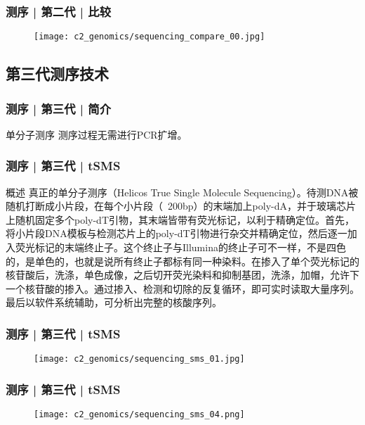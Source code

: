 \begin{frame}
  \frametitle{测序 | 第二代 | \alert{比较}}
  \begin{figure}
    \centering
    \texttt{[image: c2\_genomics/sequencing\_compare\_00.jpg]}
  \end{figure}
\end{frame}

\subsection{第三代测序技术}
\begin{frame}
  \frametitle{测序 | 第三代 | 简介}
  \begin{block}{单分子测序}
测序过程无需进行PCR扩增。
  \end{block}
\end{frame}

\begin{frame}
  \frametitle{测序 | 第三代 | tSMS}
  \begin{block}{概述}
真正的单分子测序（Helicos True Single Molecule Sequencing）。待测DNA被随机打断成小片段，在每个小片段（~200bp）的末端加上poly-dA，并于玻璃芯片上随机固定多个poly-dT引物，其末端皆带有荧光标记，以利于精确定位。首先，将小片段DNA模板与检测芯片上的poly-dT引物进行杂交并精确定位，然后逐一加入荧光标记的末端终止子。这个终止子与Illumina的终止子可不一样，不是四色的，是单色的，也就是说所有终止子都标有同一种染料。在掺入了单个荧光标记的核苷酸后，洗涤，单色成像，之后切开荧光染料和抑制基团，洗涤，加帽，允许下一个核苷酸的掺入。通过掺入、检测和切除的反复循环，即可实时读取大量序列。最后以软件系统辅助，可分析出完整的核酸序列。
  \end{block}
\end{frame}

\begin{frame}
  \frametitle{测序 | 第三代 | tSMS}
  \begin{figure}
    \centering
    \texttt{[image: c2\_genomics/sequencing\_sms\_01.jpg]}
  \end{figure}
\end{frame}

\begin{frame}
  \frametitle{测序 | 第三代 | tSMS}
  \begin{figure}
    \centering
    \texttt{[image: c2\_genomics/sequencing\_sms\_04.png]}
  \end{figure}
\end{frame}

